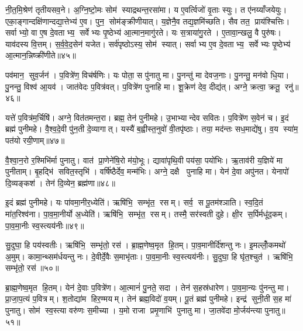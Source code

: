 नी॒त॒मि॒श्रेण॑ तृतीयसव॒ने। अ॒ग्नि॒ष्टो॒मः सोम॑ स्याद्रथन्त॒रसा॑मा। य ए॒वर्त्विजो॑ वृ॒ताः स्युः। त ए॑नय्याँजयेयुः। एका॒ङ्गान्दक्षि॑णान्दद्या॒त्तेभ्य॑ ए॒व। पुन॒ सोम॑ङ्क्रीणीयात्। य॒ज्ञेनै॒व तद्य॒ज्ञमि॑च्छति। सैव तत॒ प्राय॑श्चित्तिः। सर्वाभ्यो॒ वा ए॒ष दे॒वताभ्य॒ सर्वेभ्यः पृ॒ष्ठेभ्य॑ आ॒त्मान॒मागु॑रते। यः स॒त्राया॑गु॒रते। ए॒तावा॒न्खलु॒ वै पुरु॑षः। याव॑दस्य वि॒त्तम्। स॒र्व॒वे॒द॒सेन॑ यजेत। सर्व॑पृष्ठोऽस्य॒ सोम॑ स्यात्। सर्वाभ्य ए॒व दे॒वताभ्य॒ सर्वेभ्यः पृ॒ष्ठेभ्य॑ आ॒त्मान॒न्निष्क्री॑णीते॥४५॥\anuvakamend[उ॒द्वाय॑ति मन्थेन्मन्थत्यक्रामत्प॒राऽप॑तन्म॒ध्यन्दि॑न आगु॒रते॒ पञ्च॑ च]

पव॑मान॒ सुव॒र्जन॑। प॒वित्रे॑ण॒ विच॑र्\mbox{}षणिः। यः पोता॒ स पु॑नातु मा। पु॒नन्तु॑ मा देवज॒नाः। पु॒नन्तु॒ मन॑वो धि॒या। पु॒नन्तु॒ विश्व॑ आ॒यव॑। जात॑वेदः प॒वित्र॑वत्। प॒वित्रे॑ण पुनाहि मा। शू॒क्रेण॑ देव॒ दीद्य॑त्। अग्ने॒ क्रत्वा॒ क्रतू॒ रनु॑॥४६॥

यत्ते॑ प॒वित्र॑म॒र्चिषि॑। अग्ने॒ वित॑तमन्त॒रा। ब्रह्म॒ तेन॑ पुनीमहे। उ॒भाभ्यान्देव सवितः। प॒वित्रे॑ण स॒वेन॑ च। इ॒दं ब्रह्म॑ पुनीमहे। वै॒श्व॒दे॒वी पु॑न॒ती दे॒व्यागात्। यस्यै॑ ब॒ह्वीस्त॒नुवो॑ वी॒तपृ॑ष्ठाः। तया॒ मद॑न्तः सध॒माद्ये॑षु। व॒य स्या॑म॒ पत॑यो रयी॒णाम्॥४७॥

वै॒श्वा॒न॒रो र॒श्मिभि॑र्मा पुनातु। वात॑ प्रा॒णेने॑षि॒रो म॑यो॒भूः। द्यावा॑पृथि॒वी पय॑सा॒ पयो॑भिः। ऋ॒ताव॑री य॒ज्ञिये॑ मा पुनीताम्। बृ॒हद्भि॑ सवित॒स्तृभि॑। वर्\mbox{}षि॑ष्ठैर्देव॒ मन्म॑भिः। अग्ने॒ दक्षै पुनाहि मा। येन॑ दे॒वा अपु॑नत। येनापो॑ दि॒व्यङ्कश॑। तेन॑ दि॒व्येन॒ ब्रह्म॑णा॥४८॥

इ॒दं ब्रह्म॑ पुनीमहे। यः पा॑वमा॒नीर॒ध्येति॑। ऋषि॑भि॒ सम्भृ॑त॒ रसम्। सर्व॒ स पू॒तम॑श्ञाति। स्व॒दि॒तं मा॑त॒रिश्व॑ना। पा॒व॒मा॒नीर्यो अ॒ध्येति॑। ऋषि॑भि॒ सम्भृ॑त॒ रसम्। तस्मै॒ सर॑स्वती दुहे। क्षी॒र स॒र्पिर्मधू॑द॒कम्। पा॒व॒मा॒नीः स्व॒स्त्यय॑नीः॥४९॥

सु॒दुघा॒ हि पय॑स्वतीः। ऋषि॑भि॒ सम्भृ॑तो॒ रस॑। ब्रा॒ह्म॒णेष्व॒मृत हि॒तम्। पा॒व॒मानीर्दि॑शन्तु नः। इ॒मल्लोँ॒कमथो॑ अ॒मुम्। कामा॒न्थ्सम॑र्धयन्तु नः। दे॒वीर्दे॒वैः स॒माभृ॑ताः। पा॒व॒मा॒नीः स्व॒स्त्यय॑नीः। सु॒दुघा॒ हि घृ॑त॒श्चुत॑। ऋषि॑भि॒ सम्भृ॑तो॒ रस॑॥५०॥

ब्रा॒ह्म॒णेष्व॒मृत हि॒तम्। येन॑ दे॒वाः प॒वित्रे॑ण। आ॒त्मानं॑ पु॒नते॒ सदा। तेन॑ स॒हस्र॑धारेण। पा॒व॒मा॒न्यः पु॑नन्तु मा। प्रा॒जा॒प॒त्यं प॒वित्रम्। श॒तोद्या॑म हिर॒ण्मयम्। तेन॑ ब्रह्म॒विदो॑ व॒यम्। पू॒तं ब्रह्म॑ पुनीमहे। इन्द्र॑ सुनी॒ती स॒ह मा॑ पुनातु। सोम॑ स्व॒स्त्या वरु॑णः स॒मीच्या। य॒मो राजा प्रमृ॒णाभि॑ पुनातु मा। जा॒तवे॑दा मो॒र्जय॑न्त्या पुनातु॥५१॥\anuvakamend[अनु॑ रयी॒णां ब्रह्म॑णा स्व॒स्त्यय॑नीः सु॒दुघा॒ हि घृ॑त॒श्चुत॒ ऋषि॑भि॒ सम्भृ॑तो॒ रस॑ पुनातु॒ त्रीणि॑ च]

